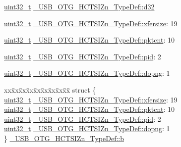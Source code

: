 \begin{DoxyCompactItemize}
\begin{tabbing}
\end{tabbing}\item 
\hyperlink{stdint_8h_a435d1572bf3f880d55459d9805097f62}{uint32\-\_\-t} \hyperlink{group___u_s_b___o_t_g___d_r_i_v_e_r_ga80c3cf6f0e0af82913acdd14390822f6}{\-\_\-\-U\-S\-B\-\_\-\-O\-T\-G\-\_\-\-H\-C\-T\-S\-I\-Zn\-\_\-\-Type\-Def\-::d32}
\item 
\hyperlink{stdint_8h_a435d1572bf3f880d55459d9805097f62}{uint32\-\_\-t} \hyperlink{group___u_s_b___o_t_g___d_r_i_v_e_r_ga3ad5a80edb18c6fc8ebe2a9979caac3d}{\-\_\-\-U\-S\-B\-\_\-\-O\-T\-G\-\_\-\-H\-C\-T\-S\-I\-Zn\-\_\-\-Type\-Def\-::xfersize}\-: 19
\item 
\hyperlink{stdint_8h_a435d1572bf3f880d55459d9805097f62}{uint32\-\_\-t} \hyperlink{group___u_s_b___o_t_g___d_r_i_v_e_r_ga053e63325d6dfa002f2efd2468957465}{\-\_\-\-U\-S\-B\-\_\-\-O\-T\-G\-\_\-\-H\-C\-T\-S\-I\-Zn\-\_\-\-Type\-Def\-::pktcnt}\-: 10
\item 
\hyperlink{stdint_8h_a435d1572bf3f880d55459d9805097f62}{uint32\-\_\-t} \hyperlink{group___u_s_b___o_t_g___d_r_i_v_e_r_gaf18e11b9b2811283695800e8afef88a2}{\-\_\-\-U\-S\-B\-\_\-\-O\-T\-G\-\_\-\-H\-C\-T\-S\-I\-Zn\-\_\-\-Type\-Def\-::pid}\-: 2
\item 
\hyperlink{stdint_8h_a435d1572bf3f880d55459d9805097f62}{uint32\-\_\-t} \hyperlink{group___u_s_b___o_t_g___d_r_i_v_e_r_gafa9fe50afa481ae6a656a4c752827a7e}{\-\_\-\-U\-S\-B\-\_\-\-O\-T\-G\-\_\-\-H\-C\-T\-S\-I\-Zn\-\_\-\-Type\-Def\-::dopng}\-: 1
\item 
\begin{tabbing}
xx\=xx\=xx\=xx\=xx\=xx\=xx\=xx\=xx\=\kill
struct \{\\
\>\hyperlink{stdint_8h_a435d1572bf3f880d55459d9805097f62}{uint32\_t} \hyperlink{group___u_s_b___o_t_g___d_r_i_v_e_r_ga3ad5a80edb18c6fc8ebe2a9979caac3d}{\_USB\_OTG\_HCTSIZn\_TypeDef::xfersize}: 19\\
\>\hyperlink{stdint_8h_a435d1572bf3f880d55459d9805097f62}{uint32\_t} \hyperlink{group___u_s_b___o_t_g___d_r_i_v_e_r_ga053e63325d6dfa002f2efd2468957465}{\_USB\_OTG\_HCTSIZn\_TypeDef::pktcnt}: 10\\
\>\hyperlink{stdint_8h_a435d1572bf3f880d55459d9805097f62}{uint32\_t} \hyperlink{group___u_s_b___o_t_g___d_r_i_v_e_r_gaf18e11b9b2811283695800e8afef88a2}{\_USB\_OTG\_HCTSIZn\_TypeDef::pid}: 2\\
\>\hyperlink{stdint_8h_a435d1572bf3f880d55459d9805097f62}{uint32\_t} \hyperlink{group___u_s_b___o_t_g___d_r_i_v_e_r_gafa9fe50afa481ae6a656a4c752827a7e}{\_USB\_OTG\_HCTSIZn\_TypeDef::dopng}: 1\\
\} \hyperlink{group___u_s_b___o_t_g___d_r_i_v_e_r_gacabd75f98a799b56f9fb7c935296b8aa}{\_USB\_OTG\_HCTSIZn\_TypeDef::b}\\


\end{tabbing}
\end{DoxyCompactItemize}
